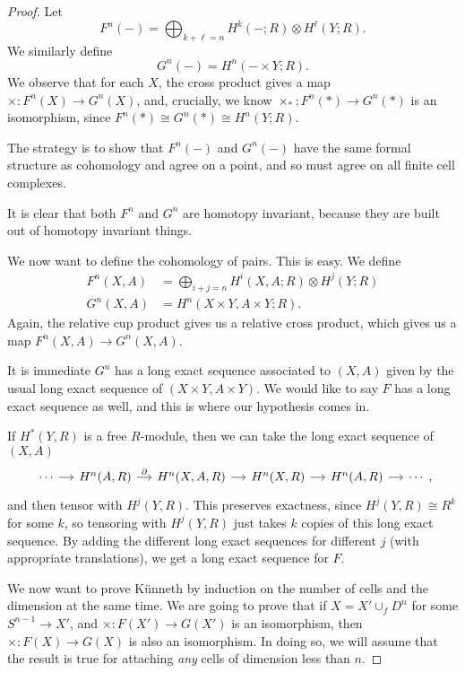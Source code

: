 \documentclass[a4paper]{article}
\begin{document}
\begin{proof}
  Let
  \[
    F^n(-) = \bigoplus_{k + \ell = n} H^k(-; R) \otimes H^\ell(Y; R).
  \]
  We similarly define
  \[
    G^n(-) = H^n(-\times Y; R).
  \]
  We observe that for each $X$, the cross product gives a map $\times: F^n(X) \to G^n(X)$, and, crucially, we know $\times_*: F^n(*) \to G^n(*)$ is an isomorphism, since $F^n(*) \cong G^n(*) \cong H^n(Y; R)$.

  The strategy is to show that $F^n(-)$ and $G^n(-)$ have the same formal structure as cohomology and agree on a point, and so must agree on all finite cell complexes.

  \separator

  It is clear that both $F^n$ and $G^n$ are homotopy invariant, because they are built out of homotopy invariant things.

  \separator

  We now want to define the cohomology of pairs. This is easy. We define
  \begin{align*}
    F^n(X, A) &= \bigoplus_{i + j = n} H^i(X, A; R) \otimes H^j(Y; R)\\
    G^n(X, A) &= H^n(X \times Y, A \times Y; R).
  \end{align*}
  Again, the relative cup product gives us a relative cross product, which gives us a map $F^n(X, A) \to G^n(X, A)$.
  
  It is immediate $G^n$ has a long exact sequence associated to $(X, A)$ given by the usual long exact sequence of $(X \times Y, A \times Y)$. We would like to say $F$ has a long exact sequence as well, and this is where our hypothesis comes in.

  If $H^*(Y, R)$ is a free $R$-module, then we can take the long exact sequence of $(X, A)$
  \[
    \begin{tikzcd}[column sep=small]
      \cdots \ar[r] & H^n(A, R) \ar[r, "\partial"] & H^n(X , A , R) \ar[r] & H^n(X , R) \ar[r] & H^n(A , R) \ar[r] & \cdots
    \end{tikzcd},
  \]
  and then tensor with $H^j(Y, R)$. This preserves exactness, since $H^j(Y, R) \cong R^k$ for some $k$, so tensoring with $H^j(Y, R)$ just takes $k$ copies of this long exact sequence. By adding the different long exact sequences for different $j$ (with appropriate translations), we get a long exact sequence for $F$.

  \separator

  We now want to prove K\"unneth by induction on the number of cells and the dimension at the same time. We are going to prove that if $X = X' \cup_f D^n$ for some $S^{n - 1} \to X'$, and $\times: F(X') \to G(X')$ is an isomorphism, then $\times: F(X) \to G(X)$ is also an isomorphism. In doing so, we will assume that the result is true for attaching \emph{any} cells of dimension less than $n$.


\end{proof}
\end{document}
